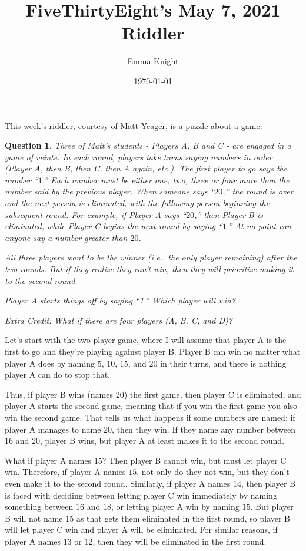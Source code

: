 \documentclass[11pt]{article}
\title{FiveThirtyEight's May 7, 2021 Riddler}
\author{Emma Knight}
\date{\today}
\newtheorem{question}[theorem]{Question}
\theoremstyle{definition}
\begin{document}
\maketitle
This week's riddler, courtesy of Matt Yeager, is a puzzle about a game:
\begin{question}
Three of Matt’s students - Players A, B and C - are engaged in a game of veinte. In each round, players take turns saying numbers in order (Player A, then B, then C, then A again, etc.). The first player to go says the number ``$1$.'' Each number must be either one, two, three or four more than the number said by the previous player. When someone says ``$20$,'' the round is over and the next person is eliminated, with the following person beginning the subsequent round. For example, if Player A says ``$20$,'' then Player B is eliminated, while Player C begins the next round by saying ``$1$.'' At no point can anyone say a number greater than $20$.

All three players want to be the winner (i.e., the only player remaining) after the two rounds. But if they realize they can’t win, then they will prioritize making it to the second round.

Player A starts things off by saying ``1.'' Which player will win?

\emph{Extra Credit}: What if there are four players (A, B, C, and D)?
\end{question}

Let's start with the two-player game, where I will assume that player A is the first to go and they're playing against player B.  Player B can win no matter what player A does by naming $5$, $10$, $15$, and $20$ in their turns, and there is nothing player A can do to stop that.

Thus, if player B wins (names $20$) the first game, then player C is eliminated, and player A starts the second game, meaning that if you win the first game you also win the second game.  That tells us what happens if some numbers are named: if player A manages to name $20$, then they win.  If they name any number between $16$ and $20$, player B wins, but player A at least makes it to the second round.

What if player A names $15$?  Then player B cannot win, but must let player C win.  Therefore, if player A names $15$, not only do they not win, but they don't even make it to the second round.  Similarly, if player A names $14$, then player B is faced with deciding between letting player C win immediately by naming something between $16$ and $18$, or letting player A win by naming $15$.  But player B will not name $15$ as that gets them eliminated in the first round, so player B will let player C win and player A will be eliminated.  For similar reasons, if player A names $13$ or $12$, then they will be eliminated in the first round.
\end{document}
